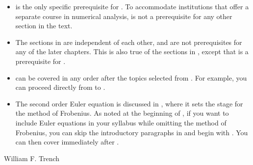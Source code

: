 \begin{itemize}
\item {}  is the only specific prerequisite for
. To accommodate institutions that offer a separate course
in numerical analysis,   is not
a prerequisite for any other section in the text.

\item The sections in  are independent of each
other, and are not prerequisites for any of the later chapters. This
is also true of the sections in , except that
 is a prerequisite for .

\item {} can be covered in any
order after the topics selected  from . For example, you
can
proceed directly from  to .

\item The second order Euler equation is discussed in
, where it sets the stage for the method of
Frobenius. As noted at the beginning of , if you
want to include Euler equations in
your syllabus while omitting the method of Frobenius, you can skip the
introductory paragraphs in  and begin with
. You can then cover
 immediately after .

\iftoggle{boundaryvalues}{%
\item \zcref[S,nocomp]{ch:bvp_fourier,ch:fourier_pde,ch:bvp_second_order} can be covered at any time
after the completion of \zcref{ch:second_order}.%
}{}%

\end{itemize}
\medskip

\hfill William F. Trench\hspace{1in}
